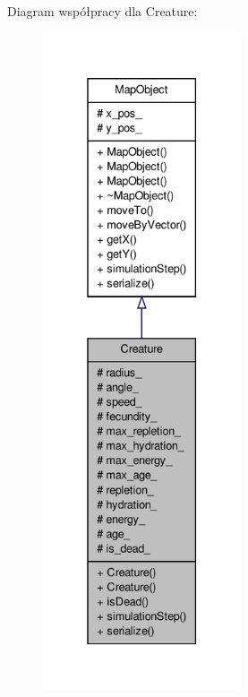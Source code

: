 Diagram współpracy dla Creature\-:
\nopagebreak
\begin{figure}[H]
\begin{center}
\leavevmode
\includegraphics[height=550pt]{classCreature__coll__graph}
\end{center}
\end{figure}
